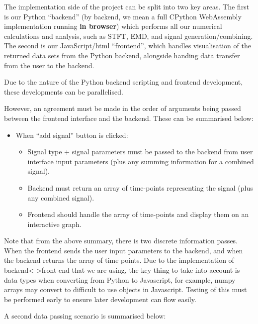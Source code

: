 \documentclass[
  english,
  paper=a4,
  oneside  ,captions=tableheading
]{scrbook}
\providecommand{\tightlist}{%
  \setlength{\itemsep}{0pt}\setlength{\parskip}{0pt}}
\begin{document}
The implementation side of the project can be split into two key areas.
The first is our Python ``backend'' (by backend, we mean a full CPython
WebAssembly implementation running \textbf{in browser}) which performs
all our numerical calculations and analysis, such as STFT, EMD, and
signal generation/combining. The second is our JavaScript/html
``frontend'', which handles visualisation of the returned data sets from
the Python backend, alongside handing data transfer from the user to the
backend.

Due to the nature of the Python backend scripting and frontend
development, these developments can be parallelised.

However, an agreement must be made in the order of arguments being
passed between the frontend interface and the backend. These can be
summarised below:

\begin{itemize}
\tightlist
\item
  When ``add signal'' button is clicked:

  \begin{itemize}
  \tightlist
  \item
    Signal type + signal parameters must be passed to the backend from
    user interface input parameters (plus any summing information for a
    combined signal).
  \item
    Backend must return an array of time-points representing the signal
    (plus any combined signal).
  \item
    Frontend should handle the array of time-points and display them on
    an interactive graph.
  \end{itemize}
\end{itemize}

Note that from the above summary, there is two discrete information
passes. When the frontend sends the user input parameters to the
backend, and when the backend returns the array of time points. Due to
the implementation of backend\textless-\textgreater front end that we
are using, the key thing to take into account is data types when
converting from Python to Javascript, for example, numpy arrays may
convert to difficult to use objects in Javascript. Testing of this must
be performed early to ensure later development can flow easily.

A second data passing scenario is summarised below:
\end{document}
